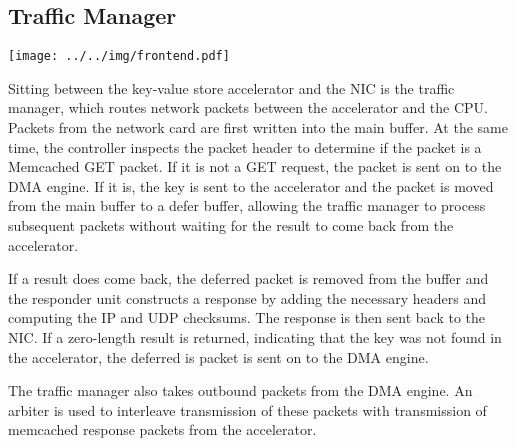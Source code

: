 \subsection{Traffic Manager}

\texttt{[image: ../../img/frontend.pdf]}

Sitting between the key-value store accelerator and the NIC is the traffic
manager, which routes network packets between the accelerator and the CPU.
Packets from the network card are first written into the main buffer.
At the same time, the controller inspects the packet header to determine if
the packet is a Memcached GET packet. If it is not a GET request, the packet
is sent on to the DMA engine. If it is, the key is sent to the accelerator and
the packet is moved from the main buffer to a defer buffer, allowing the
traffic manager to process subsequent packets without waiting for the result
to come back from the accelerator.

If a result does come back, the deferred packet is removed from the buffer and
the responder unit constructs a response by adding the necessary headers and
computing the IP and UDP checksums. The response is then sent back to the NIC.
If a zero-length result is returned, indicating that the key was not found in
the accelerator, the deferred is packet is sent on to the DMA engine.

The traffic manager also takes outbound packets from the DMA engine. An arbiter
is used to interleave transmission of these packets with transmission of
memcached response packets from the accelerator.
